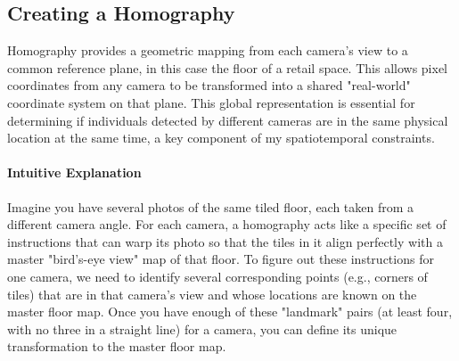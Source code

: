 \documentclass[12pt, a4paper]{article}
\begin{document}
\subsection{Creating a Homography}
Homography provides a geometric mapping from each camera's view to a common reference plane, in this case the floor of a retail space. This allows pixel coordinates from any camera to be transformed into a shared "real-world" coordinate system on that plane. This global representation is essential for determining if individuals detected by different cameras are in the same physical location at the same time, a key component of my spatiotemporal constraints.

\paragraph{Intuitive Explanation}
Imagine you have several photos of the same tiled floor, each taken from a different camera angle. For each camera, a homography acts like a specific set of instructions that can warp its photo so that the tiles in it align perfectly with a master "bird's-eye view" map of that floor. To figure out these instructions for one camera, we need to identify several corresponding points (e.g., corners of tiles) that are in that camera's view and whose locations are known on the master floor map. Once you have enough of these "landmark" pairs (at least four, with no three in a straight line) for a camera, you can define its unique transformation to the master floor map.
\end{document}
